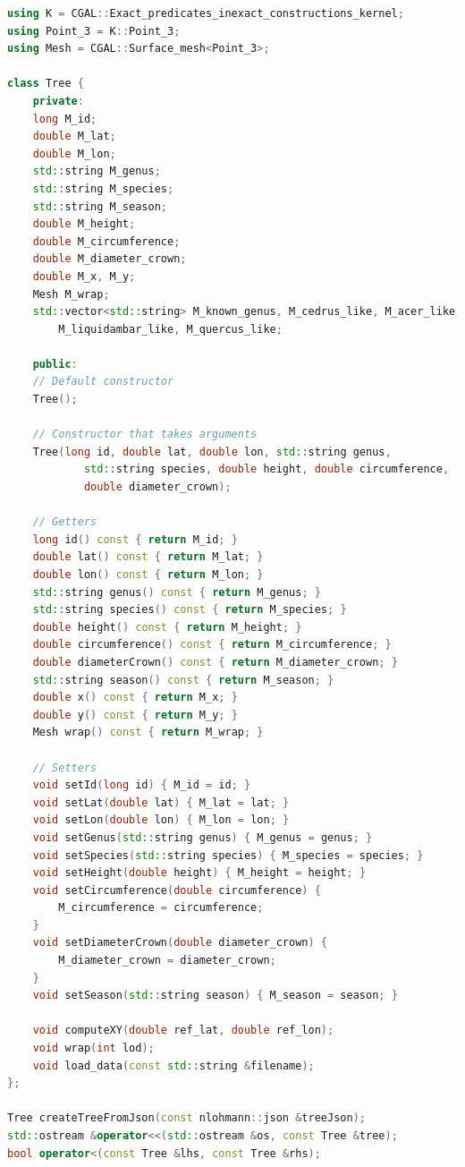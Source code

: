 \documentclass[12pt]{article}
\begin{document}
\begin{lstlisting}[language=C++]
using K = CGAL::Exact_predicates_inexact_constructions_kernel;
using Point_3 = K::Point_3;
using Mesh = CGAL::Surface_mesh<Point_3>;

class Tree {
    private:
    long M_id;
    double M_lat;
    double M_lon;
    std::string M_genus;
    std::string M_species;
    std::string M_season;
    double M_height;
    double M_circumference;
    double M_diameter_crown;
    double M_x, M_y;
    Mesh M_wrap;
    std::vector<std::string> M_known_genus, M_cedrus_like, M_acer_like,
        M_liquidambar_like, M_quercus_like;

    public:
    // Default constructor
    Tree();

    // Constructor that takes arguments
    Tree(long id, double lat, double lon, std::string genus,
            std::string species, double height, double circumference,
            double diameter_crown);

    // Getters
    long id() const { return M_id; }
    double lat() const { return M_lat; }
    double lon() const { return M_lon; }
    std::string genus() const { return M_genus; }
    std::string species() const { return M_species; }
    double height() const { return M_height; }
    double circumference() const { return M_circumference; }
    double diameterCrown() const { return M_diameter_crown; }
    std::string season() const { return M_season; }
    double x() const { return M_x; }
    double y() const { return M_y; }
    Mesh wrap() const { return M_wrap; }

    // Setters
    void setId(long id) { M_id = id; }
    void setLat(double lat) { M_lat = lat; }
    void setLon(double lon) { M_lon = lon; }
    void setGenus(std::string genus) { M_genus = genus; }
    void setSpecies(std::string species) { M_species = species; }
    void setHeight(double height) { M_height = height; }
    void setCircumference(double circumference) {
        M_circumference = circumference;
    }
    void setDiameterCrown(double diameter_crown) {
        M_diameter_crown = diameter_crown;
    }
    void setSeason(std::string season) { M_season = season; }

    void computeXY(double ref_lat, double ref_lon);
    void wrap(int lod);
    void load_data(const std::string &filename);
};

Tree createTreeFromJson(const nlohmann::json &treeJson);
std::ostream &operator<<(std::ostream &os, const Tree &tree);
bool operator<(const Tree &lhs, const Tree &rhs);
\end{lstlisting}
\end{document}
